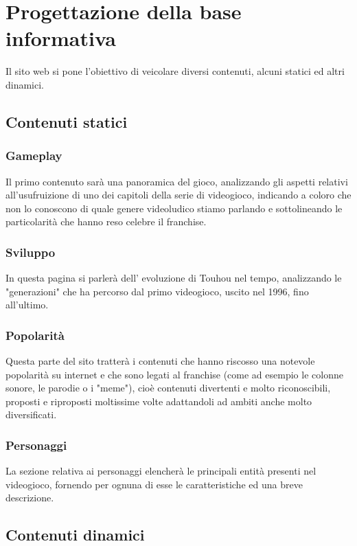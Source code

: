 \documentclass[openany, a4paper, 12pt]{report}
\begin{document}
	\section{Progettazione della base informativa}
		Il sito web si pone l'obiettivo di veicolare diversi contenuti, alcuni statici ed altri dinamici.
	\subsection{Contenuti statici}
		\subsubsection{Gameplay}
		Il primo contenuto sarà una panoramica del gioco, analizzando gli aspetti relativi all'usufruizione di uno dei capitoli della serie di videogioco, indicando a coloro che non lo conoscono di quale genere videoludico stiamo parlando e sottolineando le particolarità che hanno reso celebre il franchise.
		\subsubsection{Sviluppo}
		In questa pagina si parlerà dell' evoluzione di Touhou nel tempo, analizzando le "generazioni" che ha percorso dal primo videogioco, uscito nel 1996, fino all'ultimo.
		\subsubsection{Popolarità}
		Questa parte del sito tratterà i contenuti che hanno riscosso una notevole popolarità su internet e che sono legati al franchise (come ad esempio le colonne sonore, le parodie o i "meme"), cioè contenuti divertenti e molto riconoscibili, proposti e riproposti moltissime volte adattandoli ad ambiti anche molto diversificati.
		\subsubsection{Personaggi}
		La sezione relativa ai personaggi elencherà le principali entità presenti nel videogioco, fornendo per ognuna di esse le caratteristiche ed una breve descrizione.

	\subsection{Contenuti dinamici}
\end{document}
